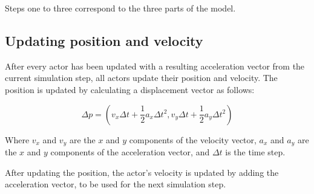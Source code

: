 Steps one to three correspond to the three parts of the model.

\subsection{Updating position and velocity}
After every actor has been updated with a resulting acceleration vector from 
the current simulation step, all actors update their position and velocity.  
The position is updated by calculating a displacement vector as follows:

\begin{equation}
    \Delta p = (v_x \Delta t + \frac{1}{2}a_x \Delta t^2, v_y \Delta t + 
    \frac{1}{2}a_y \Delta t^2)
\end{equation}

Where $v_x$ and $v_y$ are the $x$ and $y$ components of the velocity vector, 
$a_x$ and $a_y$ are the $x$ and $y$ components of the acceleration vector, and 
$\Delta t$ is the time step.

After updating the position, the actor's velocity is updated by adding the 
acceleration vector, to be used for the next simulation step.

%
%
%
%
%
%
%

